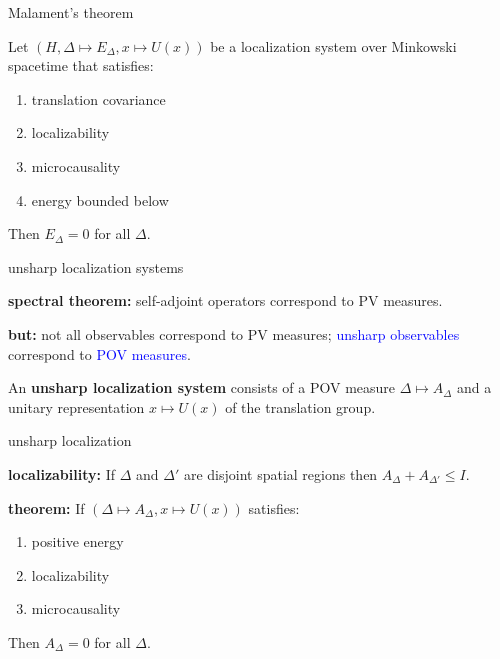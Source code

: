 \documentclass[8pt]{beamer}
\begin{document}
\begin{frame}{Malament's theorem}

Let $(H,\Delta\mapsto E_\Delta ,x\mapsto U(x))$ be a localization system over Minkowski spacetime that satisfies:
\begin{enumerate}
\item translation covariance
\item localizability
\item microcausality
\item energy bounded below
\end{enumerate}

\bigskip Then $E_\Delta =0$ for all $\Delta$.



\end{frame}


\begin{frame}{unsharp localization systems}

  \textbf{spectral theorem:} self-adjoint operators correspond to PV
  measures.

  \bigskip \textbf{but:} not all observables correspond to PV
  measures; \textcolor{blue}{unsharp observables} correspond to
  \textcolor{blue}{POV measures}.

  \bigskip An \textbf{unsharp localization system} consists of a POV
  measure $\Delta\mapsto A_\Delta$ and a unitary representation
  $x\mapsto U(x)$ of the translation group.

\end{frame}


\begin{frame}{unsharp localization}

 \textbf{localizability:} If $\Delta$ and $\Delta '$ are disjoint
  spatial regions then $A_\Delta +A_{\Delta '}\leq I$.

  \bigskip \textbf{theorem:} If $(\Delta\mapsto A_\Delta ,x\mapsto
  U(x))$ satisfies:
\begin{enumerate}
\item positive energy
\item localizability
\item microcausality
\end{enumerate}
\bigskip Then $A_\Delta =0$ for all $\Delta$.



\end{frame}
\end{document}
